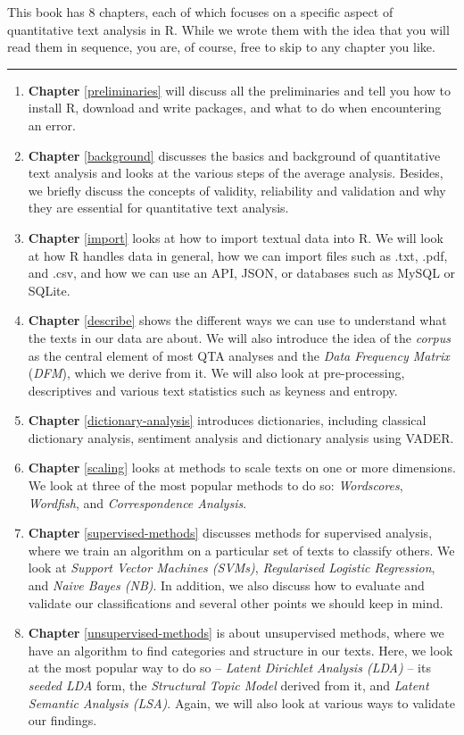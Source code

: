 \documentclass[
]{book}
\begin{document}
This book has 8 chapters, each of which focuses on a specific aspect of quantitative text analysis in R. While we wrote them with the idea that you will read them in sequence, you are, of course, free to skip to any chapter you like.

\begin{center}\rule{0.5\linewidth}{0.5pt}\end{center}

\begin{enumerate}
\def\labelenumi{\arabic{enumi}.}
\item
  \textbf{Chapter} \ref{preliminaries} will discuss all the preliminaries and tell you how to install R, download and write packages, and what to do when encountering an error.
\item
  \textbf{Chapter} \ref{background} discusses the basics and background of quantitative text analysis and looks at the various steps of the average analysis. Besides, we briefly discuss the concepts of validity, reliability and validation and why they are essential for quantitative text analysis.
\item
  \textbf{Chapter} \ref{import} looks at how to import textual data into R. We will look at how R handles data in general, how we can import files such as .txt, .pdf, and .csv, and how we can use an API, JSON, or databases such as MySQL or SQLite.
\item
  \textbf{Chapter} \ref{describe} shows the different ways we can use to understand what the texts in our data are about. We will also introduce the idea of the \emph{corpus} as the central element of most QTA analyses and the \emph{Data Frequency Matrix} (\emph{DFM}), which we derive from it. We will also look at pre-processing, descriptives and various text statistics such as keyness and entropy.
\item
  \textbf{Chapter} \ref{dictionary-analysis} introduces dictionaries, including classical dictionary analysis, sentiment analysis and dictionary analysis using VADER.
\item
  \textbf{Chapter} \ref{scaling} looks at methods to scale texts on one or more dimensions. We look at three of the most popular methods to do so: \emph{Wordscores}, \emph{Wordfish}, and \emph{Correspondence Analysis}.
\item
  \textbf{Chapter} \ref{supervised-methods} discusses methods for supervised analysis, where we train an algorithm on a particular set of texts to classify others. We look at \emph{Support Vector Machines (SVMs)}, \emph{Regularised Logistic Regression}, and \emph{Naive Bayes (NB)}. In addition, we also discuss how to evaluate and validate our classifications and several other points we should keep in mind.
\item
  \textbf{Chapter} \ref{unsupervised-methods} is about unsupervised methods, where we have an algorithm to find categories and structure in our texts. Here, we look at the most popular way to do so -- \emph{Latent Dirichlet Analysis (LDA)} -- its \emph{seeded LDA} form, the \emph{Structural Topic Model} derived from it, and \emph{Latent Semantic Analysis (LSA)}. Again, we will also look at various ways to validate our findings.
\end{enumerate}
\end{document}
